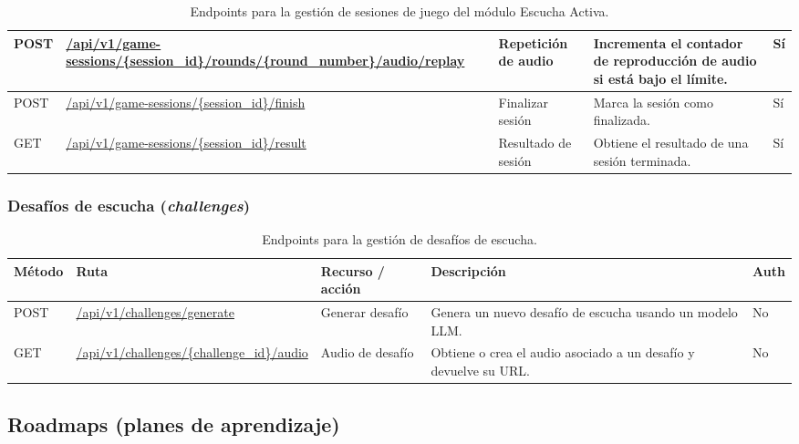 \begin{table}[H]
\begin{tabular}{|p{1.4cm}|p{4.1cm}|p{3.2cm}|p{5.8cm}|p{1cm}|}
POST & \url{/api/v1/game-sessions/{session\_id}/rounds/{round\_number}/audio/replay} &
Repetición de audio &
Incrementa el contador de reproducción de audio si está bajo el límite. &
Sí \\
\hline

POST & \url{/api/v1/game-sessions/{session\_id}/finish} & Finalizar sesión &
Marca la sesión como finalizada. &
Sí \\
\hline

GET & \url{/api/v1/game-sessions/{session\_id}/result} & Resultado de sesión &
Obtiene el resultado de una sesión terminada. &
Sí \\
\hline

\end{tabular}
\caption{Endpoints para la gestión de sesiones de juego del módulo Escucha Activa.}
\end{table}

\subsubsection*{Desafíos de escucha (\textit{challenges})}

\begin{table}[H]
\centering
\footnotesize
\setlength{\tabcolsep}{4pt}
\renewcommand{\arraystretch}{1.25}
\begin{tabular}{|p{1.4cm}|p{4.1cm}|p{3.2cm}|p{5.8cm}|p{1cm}|}
\hline
\textbf{Método} & \textbf{Ruta} & \textbf{Recurso / acción} &
\textbf{Descripción} & \textbf{Auth} \\
\hline

POST & \url{/api/v1/challenges/generate} & Generar desafío &
Genera un nuevo desafío de escucha usando un modelo LLM. &
No \\
\hline

GET & \url{/api/v1/challenges/{challenge\_id}/audio} & Audio de desafío &
Obtiene o crea el audio asociado a un desafío y devuelve su URL. &
No \\
\hline

\end{tabular}
\caption{Endpoints para la gestión de desafíos de escucha.}
\end{table}

\subsection*{Roadmaps (planes de aprendizaje)}

